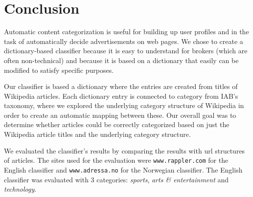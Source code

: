 \section{Conclusion}
Automatic content categorization is useful for building up user profiles and in the task of automatically decide advertisements on web pages. We chose to create a dictionary-based classifier because it is easy to understand for brokers (which are often non-technical) and because it is based on a dictionary that easily can be modified to satisfy specific purposes.  

Our classifier is based a dictionary where the entries are created from titles of Wikipedia articles. Each dictionary entry is connected to category from IAB's taxonomy, where we explored the underlying category structure of Wikipedia in order to create an automatic mapping between these. Our overall goal was to determine whether articles could be correctly categorized based on just the Wikipedia article titles and the underlying category structure. 

We evaluated the classifier's results by comparing the results with url structures of articles. The sites used for the evaluation were \texttt{www.rappler.com} for the English classifier and \texttt{www.adressa.no} for the Norwegian classifier. The English classifier was evaluated with 3 categories: \emph{sports}, \emph{arts \& entertainment} and \emph{technology}.

\begin{comment}

The results of our projects shows that it is possible to determine the content of some articles just by exploring titles of Wikipedia articles. The English classifier was evaluated on 3 categories: 



The classification to these categories showed various results, where the best evaluation scores where found within different fields:
\begin{itemize}
\item best precision was found for \emph{sports} which means that this class has fewest wrongly classified articles, i.e., low number of \emph{FP}.
\item best recall was found for \emph{arts \& entertainment} which means that the classifier found most of the articles connected to this class, i.e., low number of \emph{FN}.
\end{itemize}

We wanted a trade-off between precision and recall in our classifier, which were found by using $F_{1}$-score. 


The trade-off between \emph{precision} and \emph{recall} is important to optimize the classifier, and a classifier with 


it is desirable to create a classifier which 

so that the classifier 

\end{comment}

